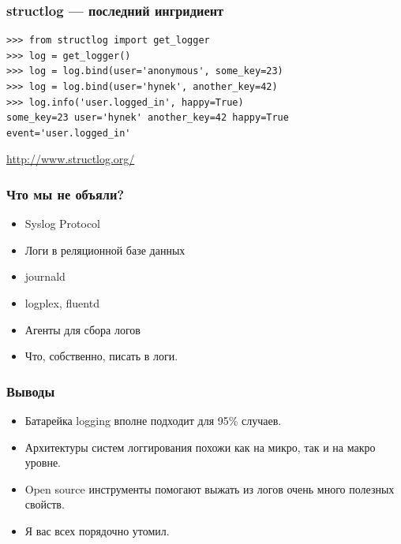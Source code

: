 \documentclass[aspectratio=169]{beamer}
\begin{document}
\begin{frame}[fragile]
  \frametitle{structlog --- последний ингридиент}

  \begin{lstlisting}
>>> from structlog import get_logger
>>> log = get_logger()
>>> log = log.bind(user='anonymous', some_key=23)
>>> log = log.bind(user='hynek', another_key=42)
>>> log.info('user.logged_in', happy=True)
some_key=23 user='hynek' another_key=42 happy=True event='user.logged_in'
  \end{lstlisting}

  \vspace{0.5cm}
  \begin{center}
    \url{http://www.structlog.org/}
  \end{center}
\end{frame}


\begin{frame}
  \frametitle{Что мы не объяли?}

  \begin{itemize}
    \item Syslog Protocol
    \item Логи в реляционной базе данных
    \item journald
    \item logplex, fluentd
    \item Агенты для сбора логов
    \item Что, собственно, писать в логи.
  \end{itemize}

\end{frame}


\begin{frame}
  \frametitle{Выводы}

  \begin{itemize}
  \item Батарейка logging вполне подходит для 95\% случаев.
  \pause
  \item Архитектуры систем логгирования похожи как на микро, так и на макро уровне.
  \pause
  \item Open source инструменты помогают выжать из логов очень много полезных свойств.
  \pause
  \item Я вас всех порядочно утомил.
  \end{itemize}
\end{frame}
\end{document}
